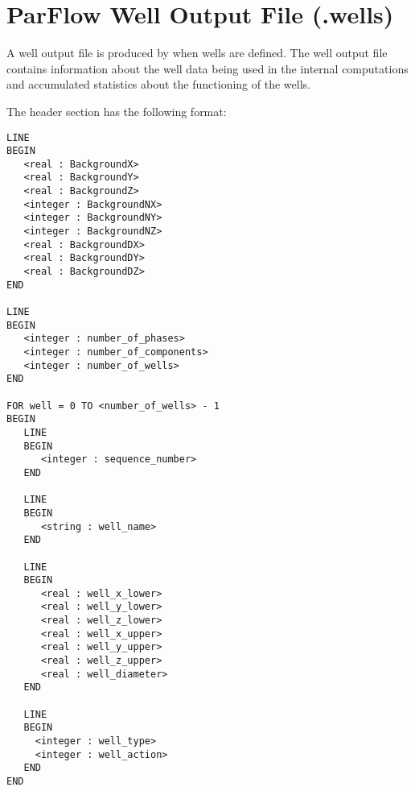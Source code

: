 
\section{ParFlow Well Output File (.wells)}
\label{ParFlow Well Output File (.wells)}

A well output file is produced by \parflow{} when wells are defined.
The well output file contains information about the well data being
used in the internal computations and accumulated statistics about
the functioning of the wells.

\noindent
The header section has the following format:
\begin{display}\begin{verbatim}
LINE
BEGIN
   <real : BackgroundX>
   <real : BackgroundY>
   <real : BackgroundZ>
   <integer : BackgroundNX>
   <integer : BackgroundNY>
   <integer : BackgroundNZ>
   <real : BackgroundDX>
   <real : BackgroundDY>
   <real : BackgroundDZ>
END

LINE
BEGIN
   <integer : number_of_phases>
   <integer : number_of_components>
   <integer : number_of_wells>
END

FOR well = 0 TO <number_of_wells> - 1
BEGIN
   LINE
   BEGIN
      <integer : sequence_number>
   END

   LINE
   BEGIN
      <string : well_name>
   END

   LINE
   BEGIN
      <real : well_x_lower>
      <real : well_y_lower>
      <real : well_z_lower>
      <real : well_x_upper>
      <real : well_y_upper>
      <real : well_z_upper>
      <real : well_diameter>
   END

   LINE
   BEGIN
     <integer : well_type>
     <integer : well_action>
   END
END
\end{verbatim}\end{display}

